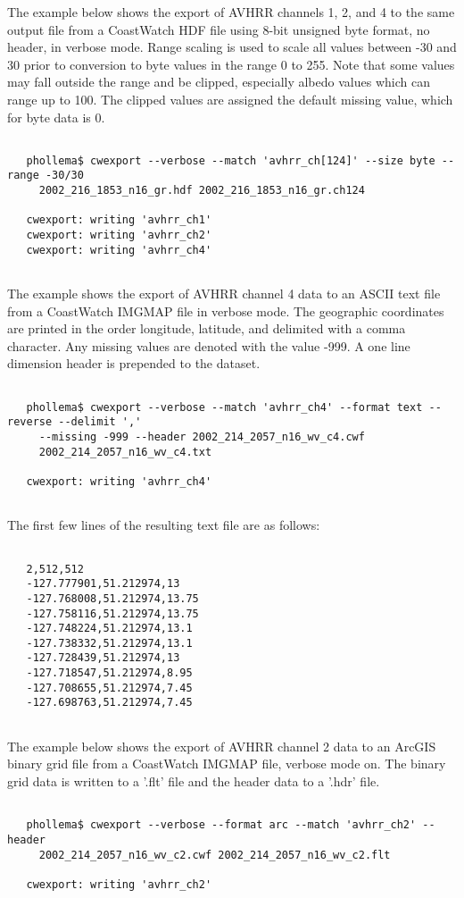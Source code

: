  The example below shows the export of AVHRR channels 1, 2, and 4 to the same output file from a CoastWatch HDF file using 8-bit unsigned byte format, no header, in verbose mode. Range scaling is used to scale all values between -30 and 30 prior to conversion to byte values in the range 0 to 255. Note that some values may fall outside the range and be clipped, especially albedo values which can range up to 100. The clipped values are assigned the default missing value, which for byte data is 0.
\begin{verbatim}

   phollema$ cwexport --verbose --match 'avhrr_ch[124]' --size byte --range -30/30
     2002_216_1853_n16_gr.hdf 2002_216_1853_n16_gr.ch124

   cwexport: writing 'avhrr_ch1'
   cwexport: writing 'avhrr_ch2'
   cwexport: writing 'avhrr_ch4'
 
\end{verbatim}


 The example shows the export of AVHRR channel 4 data to an ASCII text file from a CoastWatch IMGMAP file in verbose mode. The geographic coordinates are printed in the order longitude, latitude, and delimited with a comma character. Any missing values are denoted with the value -999. A one line dimension header is prepended to the dataset.
\begin{verbatim}

   phollema$ cwexport --verbose --match 'avhrr_ch4' --format text --reverse --delimit ','
     --missing -999 --header 2002_214_2057_n16_wv_c4.cwf 
     2002_214_2057_n16_wv_c4.txt

   cwexport: writing 'avhrr_ch4'
 
\end{verbatim}


 The first few lines of the resulting text file are as follows:
\begin{verbatim}

   2,512,512
   -127.777901,51.212974,13
   -127.768008,51.212974,13.75
   -127.758116,51.212974,13.75
   -127.748224,51.212974,13.1
   -127.738332,51.212974,13.1
   -127.728439,51.212974,13
   -127.718547,51.212974,8.95
   -127.708655,51.212974,7.45
   -127.698763,51.212974,7.45
 
\end{verbatim}


 The example below shows the export of AVHRR channel 2 data to an ArcGIS binary grid file from a CoastWatch IMGMAP file, verbose mode on. The binary grid data is written to a '.flt' file and the header data to a '.hdr' file.
\begin{verbatim}

   phollema$ cwexport --verbose --format arc --match 'avhrr_ch2' --header
     2002_214_2057_n16_wv_c2.cwf 2002_214_2057_n16_wv_c2.flt

   cwexport: writing 'avhrr_ch2'
 
\end{verbatim}


